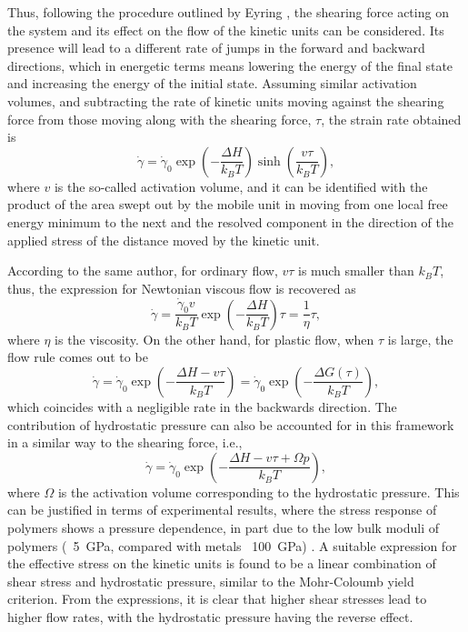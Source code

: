 Thus, following the procedure outlined by Eyring \citep{eyringViscosityPlasticityDiffusion1936}, the shearing force acting on the system and its effect on the flow of the kinetic units can be considered.
Its presence will lead to a different rate of jumps in the forward and backward directions, which in energetic terms means lowering the energy of the final state and increasing the energy of the initial state.
Assuming similar activation volumes, and subtracting the rate of kinetic units moving against the shearing force from those moving along with the shearing force, $\tau$, the strain rate obtained is
\begin{equation}
	\label{eq:eyring_model}
	\dot \gamma = \dot\gamma_0 \exp\left(-\frac{\Delta H}{k_BT}\right)\sinh\left(\frac{v\tau}{k_BT}\right),
\end{equation}
where $v$ is the so-called activation volume, and it can be identified with the product of the area swept out by the mobile unit in moving from one local free energy minimum to the next and the resolved component in the direction of the applied stress of the distance moved by the kinetic unit.

According to the same author, for ordinary flow, $v\tau$ is much smaller than $k_B T$, thus, the expression for Newtonian viscous flow is recovered as
\begin{equation}
  \label{eq:newton_fluid_flow_rule_scalar}
	\dot \gamma = \frac{\dot \gamma_0 v}{k_B T}\exp\left(-\frac{\Delta H}{k_BT}\right)\tau=\frac{1}{\eta}\tau,
\end{equation}
where $\eta$ is the viscosity.
On the other hand, for plastic flow, when $\tau$ is large, the flow rule comes out to be
\begin{equation}
\label{eq:flow_rule_thermally_activated}
	\dot\gamma = \dot \gamma_0 \exp\left(-\frac{\Delta H - v \tau}{k_B T}\right)=\dot \gamma_0 \exp\left(-\frac{\Delta G(\tau)}{k_B T}\right),
\end{equation}
which coincides with a negligible rate in the backwards direction.
The contribution of hydrostatic pressure can also be accounted for in this framework in a similar way to the shearing force, i.e.,
\begin{equation}
  \label{eq:eyring_w_pressure}
	\dot\gamma = \dot\gamma_0 \exp\left(-\frac{\Delta H - v \tau + \Omega p}{k_B T}\right),
\end{equation}
where $\Omega$ is the activation volume corresponding to the hydrostatic pressure.
This can be justified in terms of experimental results, where the stress response of polymers shows a pressure dependence, in part due to the low bulk moduli of polymers (~\SI{5}{\giga\pascal}, compared with metals ~\SI{100}{\giga\pascal}) \citep{wardIntroductionMechanicalProperties2004}.
A suitable expression for the effective stress on the kinetic units is found to be a linear combination of shear stress and hydrostatic pressure, similar to the Mohr-Coloumb yield criterion.
From the expressions, it is clear that higher shear stresses lead to higher flow rates, with the hydrostatic pressure having the reverse effect.

